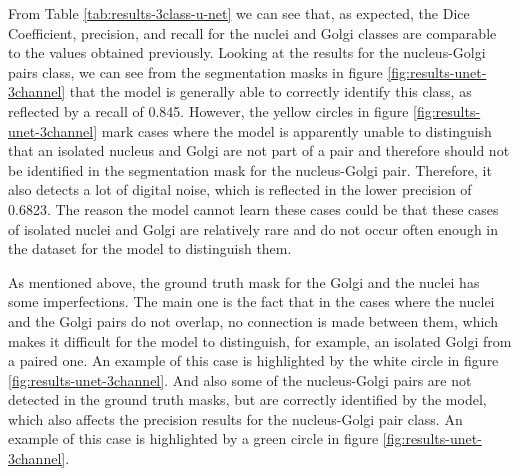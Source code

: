 \begin{table}[!htb]
\centering
\caption{Average metric values after testing the 3 class 3D U-Net model with two microscopic images}
\label{tab:results-3class-u-net}
\end{table}

From Table \ref{tab:results-3class-u-net} we can see that, as expected, the Dice Coefficient, precision, and recall for the nuclei and Golgi classes are comparable to the values obtained previously. Looking at the results for the nucleus-Golgi pairs class, we can see from the segmentation masks in figure \ref{fig:results-unet-3channel} that the model is generally able to correctly identify this class, as reflected by a recall of 0.845. However, the yellow circles in figure \ref{fig:results-unet-3channel} mark cases where the model is apparently unable to distinguish that an isolated nucleus and Golgi are not part of a pair and therefore should not be identified in the segmentation mask for the nucleus-Golgi pair. Therefore, it also detects a lot of digital noise, which is reflected in the lower precision of 0.6823. The reason the model cannot learn these cases could be that these cases of isolated nuclei and Golgi are relatively rare and do not occur often enough in the dataset for the model to distinguish them.

As mentioned above, the ground truth mask for the Golgi and the nuclei has some imperfections. The main one is the fact that in the cases where the nuclei and the Golgi pairs do not overlap, no connection is made between them, which makes it difficult for the model to distinguish, for example, an isolated Golgi from a paired one. An example of this case is highlighted by the white circle in figure \ref{fig:results-unet-3channel}. And also some of the nucleus-Golgi pairs are not detected in the ground truth masks, but are correctly identified by the model, which also affects the precision results for the nucleus-Golgi pair class. An example of this case is highlighted by a green circle in figure \ref{fig:results-unet-3channel}.

